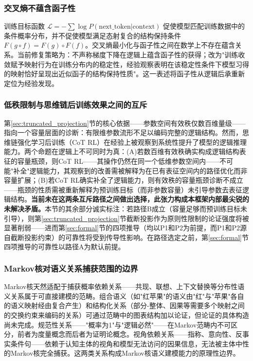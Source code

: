 \documentclass[11pt,a4paper]{article}
\theoremstyle{definition}
\begin{document}
\subsubsection{交叉熵不蕴含函子性}

训练目标函数 $\mathcal{L} = -\sum \log P(\text{next\_token}|\text{context})$ 促使模型匹配训练数据中的条件概率分布，并不促使模型满足态射复合的结构保持条件 $F(g \circ f) = F(g) \circ F(f)$。交叉熵最小化与函子性之间在数学上不存在蕴含关系。当前修复策略为：不声称梯度下降在逻辑上蕴含函子性的获得；改为"训练收敛赋予映射行为在训练分布内的稳定性，经验观察表明在该稳定性条件下模型习得的映射恰好呈现出近似函子的结构保持性质"。这一表述将函子性从逻辑后承重新定位为经验发现。

\subsubsection{低秩限制与思维链后训练效果之间的互斥}

第\ref{sec:truncated_projection}节的核心依据——参数空间有效秩仅数百维量级——指向一个容量层面的诊断：有限维参数流形不足以编码完整的逻辑结构。然而，思维链强化学习后训练（CoT RL）在经验上被观察到系统性提升了模型的逻辑推理能力。两个命题在逻辑上不可同时为真：(A)若数百维有效秩确实构成逻辑结构表征的容量瓶颈，则CoT RL——其操作仍然在同一个低维参数空间内——不可能"补全"逻辑能力，其观察到的改善需被解释为在已有表征空间内的路径优化而非容量扩展；(B)若CoT RL确实补全了逻辑能力，则有效秩的容量瓶颈诊断不成立——瓶颈的性质需被重新解释为预训练目标（而非参数容量）未引导参数去表征逻辑结构。\textbf{当前未在这两条互斥路径之间做出选择，此张力构成本框架内部最尖锐的未解决矛盾。}本节的其余部分诚实标注：若路径B成立（容量足够而预训练目标未引导），则第\ref{sec:truncated_projection}节截断投影作为原则性限制的论证强度将被显著削弱——进而第\ref{sec:formal}节的四项推导（均以P1和P2为前提，而P1和P2源自截断投影约束）的可靠性将受到传导性影响。在路径选定之前，第\ref{sec:formal}节四项推导的可靠性以路径A为默认前提。

\subsubsection{Markov核对语义关系捕获范围的边界}

Markov核天然适配于捕获概率依赖关系——共现、联想、上下文替换等分布性语义关系属于可直接建模的范畴。组合语义（如"红苹果"的语义由"红"与"苹果"各自的语义映射经由复合产生）和结构化关系（部分-整体、因果等需要多个映射之间的交换约束来编码的关系）可通过范畴中的图表结构加以论证，但论证的具体构造尚未完成。规范性关系——"概率为1"与"逻辑必然"——在Markov范畴内不可区分，前者为度量概念而后者为证明论概念。视角依赖关系——指称、意向性、反事实条件句——依赖于认知主体的视角和模型无法访问的因果信息，无法被主体中性的Markov核完全捕获。这两类关系构成Markov核语义建模能力的原理性边界。
\end{document}
